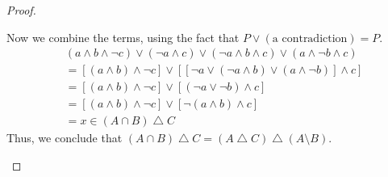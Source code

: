 \documentclass[12pt]{amsart}
\theoremstyle{definition}
\theoremstyle{remark}
\begin{document}
\begin{proof}
\begin{enumerate}
	Now we combine the terms, using the fact that $P \vee (\text{a contradiction}) = P$.
	\begin{align*}
		& (a \wedge b \wedge \neg c) \vee (\neg a \wedge c)
			\vee (\neg a \wedge b \wedge c) \vee (a \wedge \neg b \wedge c) \\
		&= [(a \wedge b) \wedge \neg c]
			\vee [[\neg a \vee (\neg a \wedge b) \vee (a \wedge \neg b)] \wedge c] \\
		&= [(a \wedge b) \wedge \neg c] \vee [(\neg a \vee \neg b) \wedge c] \\
		&= [(a \wedge b) \wedge \neg c] \vee [\neg (a \wedge b) \wedge c] \\
		&= x \in (A \cap B) \bigtriangleup C
	\end{align*}
	Thus, we conclude that $(A \cap B) \bigtriangleup C = (A \bigtriangleup C) \bigtriangleup (A \setminus B)$.
	

\end{enumerate}
\end{proof}
\end{document}
